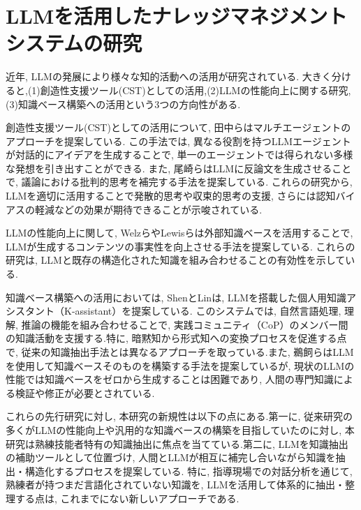 \section{LLMを活用したナレッジマネジメントシステムの研究}
近年, LLMの発展により様々な知的活動への活用が研究されている. 大きく分けると,(1)創造性支援ツール(CST)としての活用,(2)LLMの性能向上に関する研究, (3)知識ベース構築への活用という3つの方向性がある.

創造性支援ツール(CST)としての活用について, 田中らはマルチエージェントのアプローチを提案している\cite{Tanaka2024}. この手法では, 異なる役割を持つLLMエージェントが対話的にアイデアを生成することで, 単一のエージェントでは得られない多様な発想を引き出すことができる. また, 尾崎らはLLMに反論文を生成させることで, 議論における批判的思考を補完する手法を提案している\cite{Ozaki2024}. これらの研究から, LLMを適切に活用することで発散的思考や収束的思考の支援, さらには認知バイアスの軽減などの効果が期待できることが示唆されている.

LLMの性能向上に関して, WelzらやLewisらは外部知識ベースを活用することで, LLMが生成するコンテンツの事実性を向上させる手法を提案している\cite{Welz2024, Lewis2020}. これらの研究は, LLMと既存の構造化された知識を組み合わせることの有効性を示している.

知識ベース構築への活用においては, ShenとLin\cite{Shen2024}は, LLMを搭載した個人用知識アシスタント（K-assistant）を提案している. このシステムでは, 自然言語処理, 理解, 推論の機能を組み合わせることで, 実践コミュニティ（CoP）のメンバー間の知識活動を支援する.特に, 暗黙知から形式知への変換プロセスを促進する点で, 従来の知識抽出手法とは異なるアプローチを取っている.また, 鵜飼らはLLMを使用して知識ベースそのものを構築する手法を提案している\cite{Ukai2023}が, 現状のLLMの性能では知識ベースをゼロから生成することは困難であり, 人間の専門知識による検証や修正が必要とされている.

これらの先行研究に対し, 本研究の新規性は以下の点にある.第一に, 従来研究の多くがLLMの性能向上や汎用的な知識ベースの構築を目指していたのに対し, 本研究は熟練技能者特有の知識抽出に焦点を当てている.第二に, LLMを知識抽出の補助ツールとして位置づけ, 人間とLLMが相互に補完し合いながら知識を抽出・構造化するプロセスを提案している. 特に, 指導現場での対話分析を通じて, 熟練者が持つまだ言語化されていない知識を, LLMを活用して体系的に抽出・整理する点は, これまでにない新しいアプローチである. 